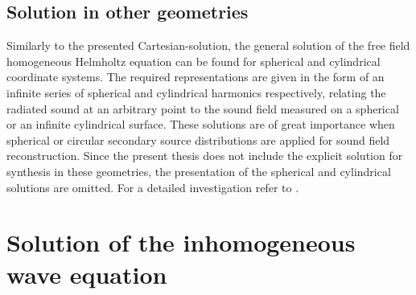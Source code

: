 %
\subsection{Solution in other geometries}
Similarly to the presented Cartesian-solution, the general solution of the free field homogeneous Helmholtz equation can be found for spherical and cylindrical coordinate systems. 
The required representations are given in the form of an infinite series of spherical and cylindrical harmonics respectively, relating the radiated sound at an arbitrary point to the sound field measured on a spherical or an infinite cylindrical surface.
These solutions are of great importance when spherical or circular secondary source distributions are applied for sound field reconstruction. 
Since the present thesis does not include the explicit solution for synthesis in these geometries, the presentation of the spherical and cylindrical solutions are omitted. 
For a detailed investigation refer to \cite{Williams1999, Zotter2009phd, Fazi2010, Ahrens2012}.
%
%
%
%
%
%
%
%
%
%
%
%
\newpage
\section{Solution of the inhomogeneous wave equation}

